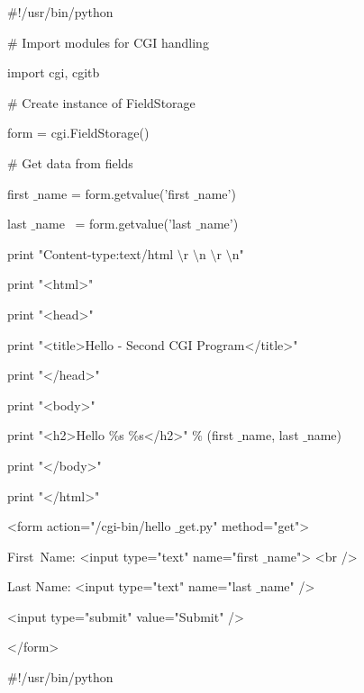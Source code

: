 \begin {enumerate}
\noindent 
 $  \#  $!/usr/bin/python \par
\vspace{12pt}
\noindent 
 $  \#  $ Import modules for CGI handling  \par
\noindent 
import cgi, cgitb  \par
\vspace{12pt}
\noindent 
 $  \#  $ Create instance of FieldStorage  \par
\noindent 
form = cgi.FieldStorage()  \par
\vspace{12pt}
\noindent 
 $  \#  $ Get data from fields \par
\noindent 
first $  \_  $name = form.getvalue('first $  \_  $name') \par
\noindent 
last $  \_  $name~ = form.getvalue('last $  \_  $name') \par
\vspace{12pt}
\noindent 
print "Content-type:text/html $  \setminus  $r $  \setminus  $n $  \setminus  $r $  \setminus  $n" \par
\noindent 
print "<html>" \par
\noindent 
print "<head>" \par
\noindent 
print "<title>Hello - Second CGI Program</title>" \par
\noindent 
print "</head>" \par
\noindent 
print "<body>" \par
\noindent 
print "<h2>Hello  $  \%  $s  $  \%  $s</h2>"  $  \%  $ (first $  \_  $name, last $  \_  $name) \par
\noindent 
print "</body>" \par
\noindent 
print "</html>" \par
\vspace{12pt}
\noindent 
<form action="/cgi-bin/hello $  \_  $get.py" method="get"> \par
\noindent 
First~Name: <input type="text" name="first $  \_  $name">  <br /> \par
\vspace{12pt}
\noindent 
Last Name: <input type="text" name="last $  \_  $name" /> \par
\noindent 
<input type="submit" value="Submit" /> \par
\noindent 
</form> \par
\vspace{12pt}
\noindent 
 $  \#  $!/usr/bin/python \par
\vspace{12pt}

\end{enumerate}
